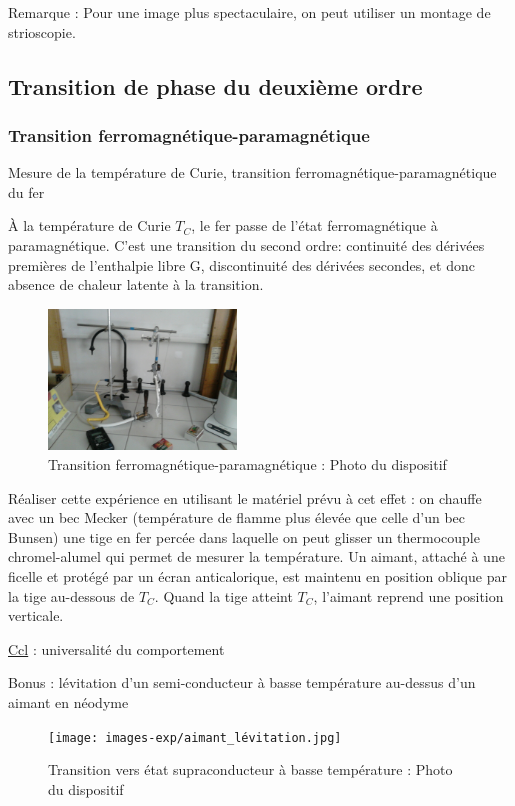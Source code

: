 \documentclass{article}%
\begin{document}
Remarque : Pour une image plus spectaculaire, on peut utiliser un montage de strioscopie.


\subsection{Transition de phase du deuxième ordre}
\subsubsection{Transition ferromagnétique-paramagnétique}

Mesure de la température de Curie, transition ferromagnétique-paramagnétique du fer

À la température de Curie $T_C$, le fer passe de l'état ferromagnétique à paramagnétique. C'est une transition du second ordre: continuité des dérivées premières de l'enthalpie libre G, discontinuité des dérivées secondes, et donc absence de chaleur latente à la transition.
\begin{figure}
	\centerline{\includegraphics[width=5cm]{images-exp/transition_ferro_para.jpg}}
	\caption{Transition ferromagnétique-paramagnétique : Photo du dispositif}
\end{figure}

Réaliser cette expérience en utilisant le matériel prévu à cet effet : on chauffe avec un bec Mecker (température de flamme plus élevée que celle d'un bec Bunsen) une tige en fer percée dans laquelle on peut glisser un thermocouple chromel-alumel qui permet de mesurer la température. Un aimant, attaché à une ficelle et protégé par un écran anticalorique, est maintenu en position oblique par la tige au-dessous de $T_C$. Quand la tige atteint $T_C$, l'aimant reprend une position verticale. 

\underline{Ccl} : universalité du comportement

\og{}Bonus\fg{} : lévitation d'un semi-conducteur à basse température au-dessus d'un aimant en néodyme

\begin{figure}
	\centerline{\texttt{[image: images-exp/aimant\_lévitation.jpg]}}
	\caption{Transition vers état supraconducteur à basse température : Photo du dispositif}
\end{figure}
\end{document}
